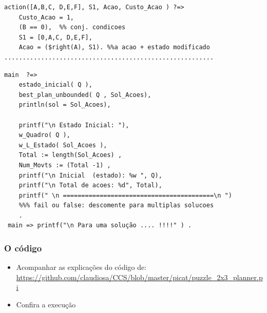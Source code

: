 \begin{frame}[fragile, allowframebreaks=0.9]
\begin{footnotesize}
\begin{verbatim}
action([A,B,C, D,E,F], S1, Acao, Custo_Acao ) ?=>
    Custo_Acao = 1,
    (B == 0),  %% conj. condicoes
    S1 = [0,A,C, D,E,F],
    Acao = ($right(A), S1). %%a acao + estado modificado
.........................................................
\end{verbatim}

\end{footnotesize}
\framebreak

\begin{footnotesize}
\begin{verbatim}
main  ?=>  
    estado_inicial( Q ),
    best_plan_unbounded( Q , Sol_Acoes), 
    println(sol = Sol_Acoes),
        
    printf("\n Estado Inicial: "),
    w_Quadro( Q ), 
    w_L_Estado( Sol_Acoes ), 
    Total := length(Sol_Acoes) ,
    Num_Movts := (Total -1) ,
    printf("\n Inicial  (estado): %w ", Q),
    printf("\n Total de acoes: %d", Total), 
    printf(" \n =========================================\n ")
    %%% fail ou false: descomente para multiplas solucoes
    .
 main => printf("\n Para uma solução .... !!!!" ) .
\end{verbatim}

\end{footnotesize}

\end{frame}



\begin{frame}[fragile]
 \frametitle{O código}

\begin{itemize}
  \item Acompanhar as explicações do código de:\\
\url{https://github.com/claudiosa/CCS/blob/master/picat/puzzle_2x3_planner.pi}

  \item Confira a execuç\~ao
\end{itemize}
\end{frame}


